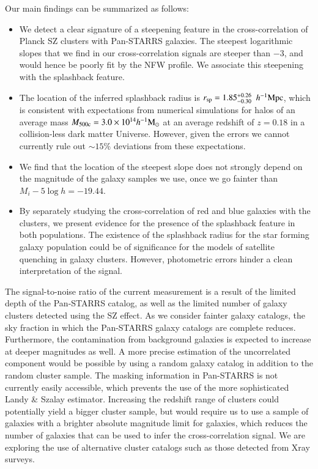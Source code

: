 \documentclass[iop, apjl, twocolappendix, numberedappendix]{emulateapj}
\def\mpch{h^{-1}{\rm Mpc}}
\def\msunh{h^{-1}{\rm M_{\odot}}}
\begin{document}
Our main findings can be summarized as follows:
\begin{itemize}
\item We detect a clear signature of a steepening feature in the
cross-correlation of Planck SZ clusters with Pan-STARRS
galaxies. The steepest logarithmic slopes that we find in our cross-correlation
signals are steeper than $-3$, and would hence be poorly fit by the
NFW profile. We associate this steepening with the splashback feature.
\item The location of the inferred splashback radius is $r_{\rm
sp}=1.85_{-0.30}^{+0.26}$ $\mpch$, which is consistent with expectations
from numerical simulations for
halos of an average mass $M_{\rm 500c}=3.0\times10^{14}\msunh$ at an
average redshift of $z=0.18$ in a collision-less dark matter Universe. 
However, given the errors we cannot
currently rule out $\sim15\%$ deviations from these expectations.
\item We find that the location of the steepest slope does not
strongly depend on the magnitude of the galaxy samples we use, once
we go fainter than $M_i-5\log h=-19.44$.
\item By separately studying the cross-correlation of red and blue
galaxies with the clusters, we present evidence for the presence of
the splashback feature in both populations. The existence of the
splashback radius for the 
star forming galaxy population could be of significance for the
models of satellite quenching in galaxy clusters. However, photometric
errors hinder a clean interpretation of the signal.
\end{itemize}

The signal-to-noise ratio of the current measurement is a result of
the limited depth of the Pan-STARRS catalog, as well as the limited
number of galaxy clusters detected using the SZ effect. As we consider
fainter galaxy catalogs, the sky fraction in which the Pan-STARRS
galaxy catalogs are complete reduces. Furthermore, the contamination
from background galaxies is expected to increase at deeper magnitudes
as well. A more precise estimation of the
uncorrelated component would be possible by using a random galaxy
catalog in addition to the random cluster sample. The masking
information in Pan-STARRS is not currently easily accessible, which
prevents the use of the more sophisticated Landy \& Szalay estimator. 
Increasing the redshift range of clusters could potentially yield a
bigger cluster sample, but would require us to use a sample of
galaxies with a brighter absolute magnitude limit for galaxies, 
which reduces the number of galaxies that can be used to infer the
cross-correlation signal. We are exploring the use of alternative
cluster catalogs such as those detected from Xray surveys.
\end{document}
